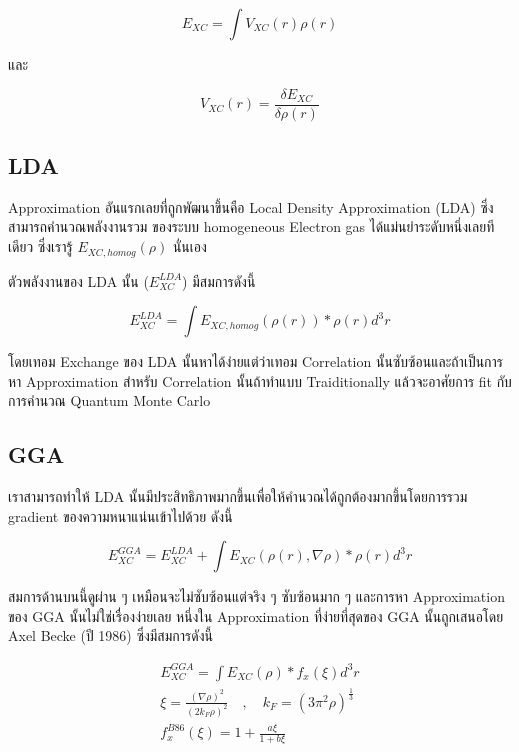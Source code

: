 \begin{equation}
    E_{XC} = \int V_{X C}(r) \rho(r)
\end{equation}

\noindent และ

\begin{equation}
    V_{X C}(r) = \frac{\delta E_{X C}}{\delta \rho(r)}
\end{equation}

\subsection{LDA}

Approximation อันแรกเลยที่ถูกพัฒนาขึ้นคือ Local Density Approximation (LDA) ซึ่งสามารถคำนวณพลังงานรวม%
ของระบบ homogeneous Electron gas ได้แม่นยำระดับหนึ่งเลยทีเดียว ซึ่งเรารู้ $E_{XC, homog}(\rho)$
นั่นเอง

ตัวพลังงานของ LDA นั้น ($E^{LDA}_{XC}$) มีสมการดังนี้

\begin{equation}
    E^{LDA}_{XC} = \int E_{XC,homog} (\rho(r)) * \rho(r)d^{3}r
\end{equation}

โดยเทอม Exchange ของ LDA นั้นหาได้ง่ายแต่ว่าเทอม Correlation นั้นซับซ้อนและถ้าเป็นการหา Approximation
สำหรับ Correlation นั้นถ้าทำแบบ Traiditionally แล้วจะอาศัยการ fit กับการคำนวณ Quantum Monte Carlo

\subsection{GGA}

เราสามารถทำให้ LDA นั้นมีประสิทธิภาพมากขึ้นเพื่อให้คำนวณได้ถูกต้องมากขึ้นโดยการรวม gradient ของความหนาแน่นเข้าไปด้วย
ดังนี้

\begin{equation}
    E^{GGA}_{XC} = E^{LDA}_{XC} + \int E_{XC} (\rho(r), \nabla\rho) * \rho(r)d^{3}r
\end{equation}

สมการด้านบนนี้ดูผ่าน ๆ เหมือนจะไม่ซับซ้อนแต่จริง ๆ ซับซ้อนมาก ๆ และการหา Approximation ของ GGA
นั้นไม่ใช่เรื่องง่ายเลย หนึ่งใน Approximation ที่ง่ายที่สุดของ GGA นั้นถูกเสนอโดย Axel Becke (ปี 1986)
ซึ่งมีสมการดังนี้

\begin{gather}
    E^{GGA}_{XC} = \int E_{XC} (\rho) * f_{x}(\xi) d^{3}r \\
    \xi = \frac{(\nabla \rho)^{2}}{(2 k_{F} \rho)^{2}}
    \quad , \quad k_{F} = (3\pi^{2}\rho)^{\frac{1}{3}} \\
    f^{B86}_{x}(\xi) = 1 + \frac{a\xi}{1 + b\xi}
\end{gather}

